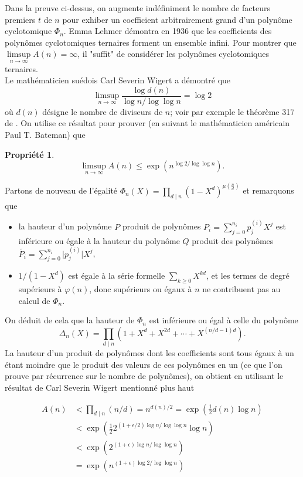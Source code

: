 \documentclass{article}
\theoremstyle{break}                  %
\newtheorem{propriete}{Propriété}
\begin{document}
Dans la preuve ci-dessus, on augmente indéfiniment le nombre de facteurs premiers $t$ de $n$ pour exhiber un coefficient arbitrairement grand d'un polynôme cyclotomique $\Phi_n$. Emma Lehmer démontra en 1936 \cite{infini} que les coefficients des polynômes cyclotomiques ternaires forment un ensemble infini. Pour montrer que $\limsup\limits_{n \to \infty} A(n) = \infty$, il "suffit" de considérer les polynômes cyclotomiques ternaires.\\

Le mathématicien suédois Carl Severin Wigert a démontré que
$$\limsup\limits_{n \to \infty} \frac{\log d(n)}{\log n / \log \log n} = \log 2$$ où $d(n)$ désigne le nombre de diviseurs de $n$; voir par exemple le théorème 317 de  \cite{numbers}. On utilise ce résultat pour prouver (en suivant le mathématicien américain Paul T. Bateman) que

\begin{propriete}
	$$\limsup\limits_{n \to \infty} A(n) \le \exp(n^{\log 2 / \log \log n}).$$
\end{propriete}

Partons de nouveau de l'égalité $\Phi_n(X) = \prod_{d \mid n} (1-X^d)^{\mu(\frac{n}{d})}$ et remarquons que
\begin{itemize}
	\item la hauteur d'un polynôme $P$ produit de polynômes $P_i = \sum_{j=0}^{n_i} p_j^{(i)} X^j$ est inférieure ou égale à la hauteur du polynôme $Q$ produit des polynômes $\widetilde{P_i} = \sum_{j=0}^{n_i} \lvert p_j^{(i)} \rvert X^j$,
	\item $1/(1-X^d)$ est égale à la série formelle $\sum_{k \ge 0} X^{kd}$, et les termes de degré supérieurs à $\varphi(n)$, donc supérieurs ou égaux à $n$ ne contribuent pas au calcul de $\Phi_n$.\\
\end{itemize}
On déduit de cela que la hauteur de $\Phi_n$ est inférieure ou égal à celle du polynôme
$$\Delta_n(X) = \prod_{d \mid n} (1 + X^d + X^{2d} + \cdots + X^{(n/d - 1)d}).$$
La hauteur d'un produit de polynômes dont les coefficients sont tous égaux à un étant moindre que le produit des valeurs de ces polynômes en un (ce que l'on prouve par récurrence sur le nombre de polynômes), on obtient en utilisant le résultat de Carl Severin Wigert mentionné plus haut

\begin{align*}
	A(n) &< \prod_{d \mid n} (n/d) = n^{d(n)/2} = \exp\left(\frac{1}{2}d(n) \log n\right)\\
	&< \exp\left(\frac{1}{2}2^{(1+\epsilon/2)\log n/ \log \log n}\log n\right)\\
	&< \exp\left(2^{(1+\epsilon)\log n/ \log \log n}\right)\\
	&= \exp\left(n^{(1+\epsilon)\log 2/ \log \log n}\right)
\end{align*}
\end{document}

